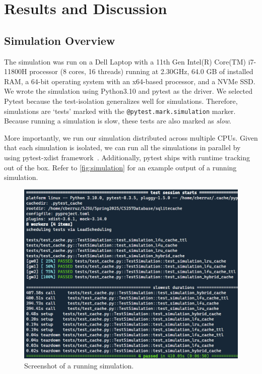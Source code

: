 
\section{Results and Discussion\label{sec:results}}
\subsection{Simulation Overview}
The simulation was run
on a Dell Laptop with a 11th Gen Intel(R) Core(TM) i7-11800H processor (8 cores, 16 threads)
running at 2.30GHz, 64.0 GB of installed RAM,
a 64-bit operating system with an x64-based processor, and a NVMe SSD.
We wrote the simulation
using Python3.10 and pytest as the driver.
We selected Pytest because the test-isolation generalizes
well for simulations. Therefore, simulations
are `tests' marked with the \texttt{@pytest.mark.simulation}
marker. Because running a simulation is slow,
these tests are also marked as \textit{slow}.

More importantly, we run our simulation
distributed across multiple CPUs. Given that
each simulation is isolated, we can run
all the simulations in parallel
by using pytest-xdist framework~\cite{pytestXdist}.
Additionally, pytest ships with runtime
tracking out of the box.
Refer to \autoref{fig:simulation}
for an example output of a running simulation.

\begin{figure}[!htp]
    \centering
    \includegraphics[width=\linewidth]{images/simulation_running_example.png}
    \caption{Screenshot of a running simulation.}
    \label{fig:simulation}
\end{figure}

